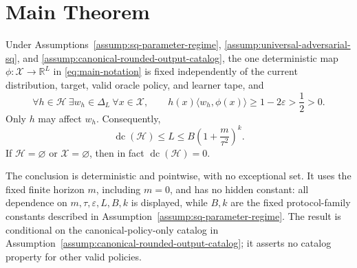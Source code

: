 \section{Main Theorem}
\label{sec:main-theorem}

\begin{theorem}
\label{thm:main}
Under Assumptions~\ref{assump:sq-parameter-regime},
\ref{assump:universal-adversarial-sq}, and
\ref{assump:canonical-rounded-output-catalog}, the one deterministic map
\(\phi:\mathcal X\to\mathbb R^L\) in \eqref{eq:main-notation} is fixed
independently of the current distribution, target, valid oracle policy, and
learner tape, and
\begin{equation}
\forall h\in\mathcal H\ \exists w_h\in\Delta_L\ \forall x\in\mathcal X,
\qquad
h(x)\langle w_h,\phi(x)\rangle
\ge1-2\varepsilon>\frac12>0.
\label{eq:main-margin}
\end{equation}
Only \(h\) may affect \(w_h\).  Consequently,
\begin{equation}
\operatorname{dc}(\mathcal H)
\le L
\le B\left(1+\frac{m}{\tau^2}\right)^k.
\label{eq:main-dimension-bound}
\end{equation}
If \(\mathcal H=\varnothing\) or \(\mathcal X=\varnothing\), then in fact
\(\operatorname{dc}(\mathcal H)=0\).

The conclusion is deterministic and pointwise, with no exceptional set.  It
uses the fixed finite horizon \(m\), including \(m=0\), and has no hidden
constant: all dependence on \(m,\tau,\varepsilon,L,B,k\) is displayed, while
\(B,k\) are the fixed protocol-family constants described in
Assumption~\ref{assump:sq-parameter-regime}.  The result is conditional on
the canonical-policy-only catalog in
Assumption~\ref{assump:canonical-rounded-output-catalog}; it asserts no
catalog property for other valid policies.
\end{theorem}
